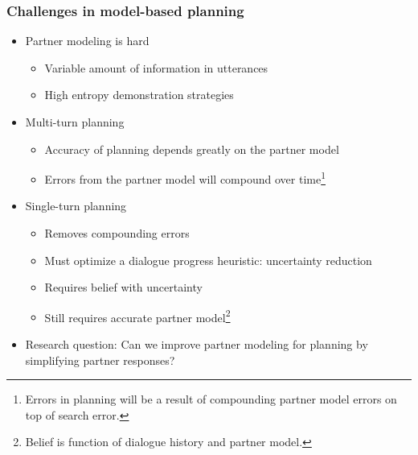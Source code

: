 \documentclass{beamer}
\begin{document}
\begin{frame}
\frametitle{Challenges in model-based planning}
\begin{itemize}
\item Partner modeling is hard
    \begin{itemize}
    \item Variable amount of information in utterances
    \item High entropy demonstration strategies
    \end{itemize}
\item Multi-turn planning
    \begin{itemize}
    \item Accuracy of planning depends greatly on the partner model
    \item Errors from the partner model will compound over time\footnote{
        Errors in planning will be a result of compounding partner model errors
            on top of search error.
    }
    \end{itemize}
\item Single-turn planning
    \begin{itemize}
    \item Removes compounding errors
    \item Must optimize a dialogue progress heuristic: uncertainty reduction
    \item Requires belief with uncertainty
    \item Still requires accurate partner model\footnote{
        Belief is function of dialogue history and partner model.
    }
    \end{itemize}
\item Research question: Can we improve partner modeling for planning
    by simplifying partner responses?
\end{itemize}
\end{frame}
\end{document}
